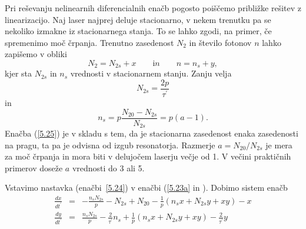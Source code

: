 Pri reševanju nelinearnih diferencialnih enačb pogosto poiščemo približke rešitev
z linearizacijo. Naj laser najprej deluje stacionarno, v nekem trenutku pa se 
nekoliko izmakne iz stacionarnega stanja. To se lahko zgodi, na primer, če
spremenimo moč črpanja. Trenutno zasedenost $N_2$ in število fotonov $n$
lahko zapišemo v obliki 
\begin{equation}  
N_2= N_{2s}+x \qquad {\mathrm in} \qquad n=n_s+y,
\label{5.24}
\end{equation}
kjer sta $N_{2s}$ in $n_s$ vrednosti v stacionarnem stanju. Zanju velja 
\begin{equation}  
N_{2s}=\frac{2p}{\tau^{\prime}}
\label{5.25}
\end{equation}
in 
\begin{equation} 
n_s=p\frac{N_{20}-N_{2s}}{N_{2s}}=p(a-1).
\label{5.26}
\end{equation}
Enačba (\ref{5.25}) je v skladu s tem, da je stacionarna zasedenost 
enaka zasedenosti na pragu, ta pa je odvisna od izgub resonatorja. 
Razmerje $a=N_{20}/N_{2s}$ je mera za moč črpanja in
mora biti v delujočem laserju večje od 1. V večini praktičnih primerov
doseže $a$ vrednosti do 3 ali 5.

Vstavimo nastavka (enačbi~\ref{5.24}) v enačbi (\ref{5.23a} in \label{5.23}). 
Dobimo sistem enačb
\begin{eqnarray}  
\frac{d x}{d t^{\prime}} &=&-\frac{n_sN_{2s}}{p}-N_{2s}+N_{20}- \frac{1}{p}
(n_sx+N_{2s}y+xy)-x \\
\frac{d y}{d t^{\prime}} &=& \frac{n_sN_{2s}}{p}-\frac{2}{\tau^{\prime}}n_s
+ \frac{1}{p}(n_s x+N_{2s} y+xy)-\frac{2}{\tau^{\prime}}y
\label{5.27}
\end{eqnarray}

